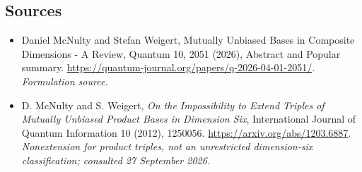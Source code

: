 \documentclass[11pt]{article}
\begin{document}
\subsection{Sources}
\begin{itemize}
\item[S1]Daniel McNulty and Stefan Weigert, Mutually Unbiased Bases in Composite Dimensions - A Review, Quantum 10, 2051 (2026), Abstract and Popular summary.
\url{https://quantum-journal.org/papers/q-2026-04-01-2051/}.
\textit{Formulation source.}
\item[E1]D. McNulty and S. Weigert, \emph{On the Impossibility to Extend Triples of Mutually Unbiased Product Bases in Dimension Six}, International Journal of Quantum Information 10 (2012), 1250056.
\url{https://arxiv.org/abs/1203.6887}.
\textit{Nonextension for product triples, not an unrestricted dimension-six classification; consulted 27 September 2026.}
\end{itemize}
\end{document}

